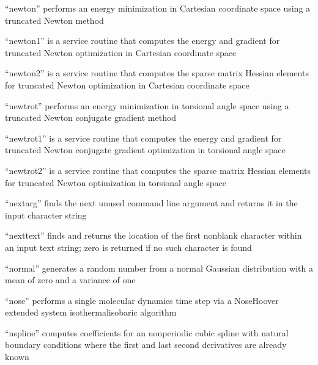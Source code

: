 \documentclass[letterpaper,11pt,english]{sphinxmanual}
\begin{document}
“newton” performs an energy minimization in Cartesian
coordinate space using a truncated Newton method


“newton1” is a service routine that computes the energy
and gradient for truncated Newton optimization in Cartesian
coordinate space


“newton2” is a service routine that computes the sparse
matrix Hessian elements for truncated Newton optimization
in Cartesian coordinate space


“newtrot” performs an energy minimization in torsional angle
space using a truncated Newton conjugate gradient method


“newtrot1” is a service routine that computes the energy
and gradient for truncated Newton conjugate gradient
optimization in torsional angle space


“newtrot2” is a service routine that computes the sparse
matrix Hessian elements for truncated Newton optimization
in torsional angle space


“nextarg” finds the next unused command line argument
and returns it in the input character string


“nexttext” finds and returns the location of the first
non\sphinxhyphen{}blank character within an input text string; zero
is returned if no such character is found


“normal” generates a random number from a normal Gaussian
distribution with a mean of zero and a variance of one


“nose” performs a single molecular dynamics time step via
a Nose\sphinxhyphen{}Hoover extended system isothermal\sphinxhyphen{}isobaric algorithm


“nspline” computes coefficients for an nonperiodic cubic spline
with natural boundary conditions where the first and last second
derivatives are already known
\end{document}
